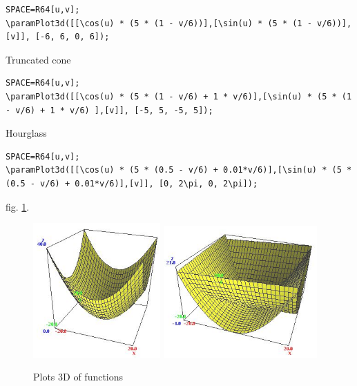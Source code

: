 \begin{verbatim}
SPACE=R64[u,v];
\paramPlot3d([[\cos(u) * (5 * (1 - v/6))],[\sin(u) * (5 * (1 - v/6))],[v]], [-6, 6, 0, 6]);
\end{verbatim}

Truncated cone 

\begin{verbatim}
SPACE=R64[u,v];
\paramPlot3d([[\cos(u) * (5 * (1 - v/6) + 1 * v/6)],[\sin(u) * (5 * (1 - v/6) + 1 * v/6) ],[v]], [-5, 5, -5, 5]);
\end{verbatim}

Hourglass

\begin{verbatim}
SPACE=R64[u,v];
\paramPlot3d([[\cos(u) * (5 * (0.5 - v/6) + 0.01*v/6)],[\sin(u) * (5 * (0.5 - v/6) + 0.01*v/6)],[v]], [0, 2\pi, 0, 2\pi]);
\end{verbatim}


 
{fig. \ref{3_7}.}

\begin{figure}[!ht]
  \includegraphics[width=138pt, height=146pt]{pictures/3_7}
  \includegraphics[width=166.5pt, height=143pt]{pictures/3_8}
  \caption{Plots 3D of  functions}
  \label{3_7}
\end{figure}


